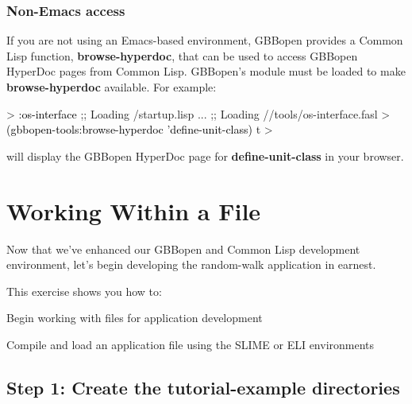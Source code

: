 \documentclass[10pt,twoside,english,pdftex]{article}
\begin{document}
\subsubsection*{Non-Emacs access}

%
If you are not using an Emacs-based environment, GBBopen provides a Common
Lisp function, \textbf{browse-hyperdoc}, that can be used to access GBBopen
HyperDoc pages from Common Lisp.  GBBopen's  module must be loaded to make \textbf{browse-hyperdoc} available.  For example:
%
\begin{example}\color{darkergray}%
  > \textcolor{black}{:os-interface}
  ;; Loading /startup.lisp
     ...
  ;; Loading //tools/os-interface.fasl
  > \textcolor{black}{(gbbopen-tools:browse-hyperdoc 'define-unit-class)}
  t
  >
\end{example}
%
will display the GBBopen HyperDoc page for \textbf{define-unit-class} in your
browser. 


\T\markright{}%
\T\pagestyle{plain}
\T\cleardoublepage
\W{}
\T\pagestyle{fancy}
\T\thispagestyle{fancybottom}
\T\renewcommand{\headrulewidth}{0pt}
\section{Working Within a File}
\label{sec:file}%

Now that we've enhanced our GBBopen and Common Lisp development environment,
let's begin developing the random-walk application in earnest.

\fndocrule

This exercise shows you how to:
\begin{tightitemize}
\item Begin working with files for application development
\item Compile and load an application file using the SLIME or ELI
  environments
\end{tightitemize}

\fndocrule

\subsection*{Step 1: Create the tutorial-example directories}
\end{document}
